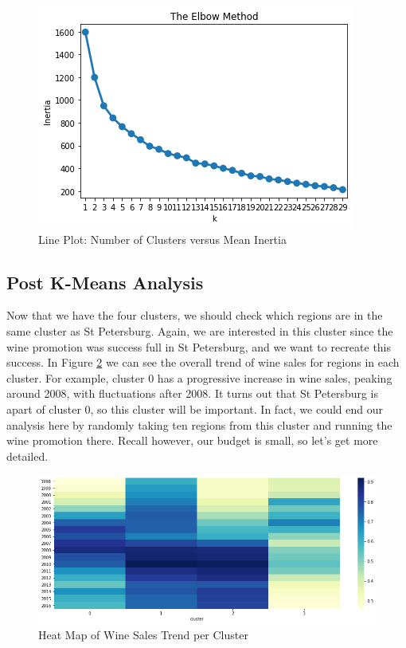 \documentclass{article}
\begin{document}
\begin{figure}[!htb]
    \centering
    \includegraphics[scale = .7]{Graphs/elbow_method.png}
    \caption{Line Plot: Number of Clusters versus Mean Inertia}
    \label{fig:elbow}
\end{figure}

\subsection{Post K-Means Analysis}
Now that we have the four clusters, we should check which regions are in the same cluster as St Petersburg. Again, we are interested in this cluster since the wine promotion was success full in St Petersburg, and we want to recreate this success. In Figure \ref{fig:heatmap_c} we can see the overall trend of wine sales for regions in each cluster. For example, cluster $0$ has a progressive increase in wine sales, peaking around 2008, with fluctuations after 2008. It turns out that St Petersburg is apart of cluster 0, so this cluster will be important. In fact, we could end our analysis here by randomly taking ten regions from this cluster and running the wine promotion there. Recall however, our budget is small, so let's get more detailed.\newline

\begin{figure}[!htb]
    \centering
    \includegraphics[scale = .5]{Graphs/heatmap_cluster.png}
    \caption{Heat Map of Wine Sales Trend per Cluster}
    \label{fig:heatmap_c}
\end{figure}
\end{document}
